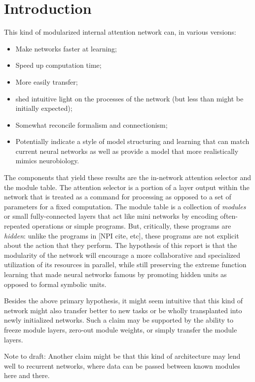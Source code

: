 \documentclass[12pt]{article}
\begin{document}
\section{Introduction}
This kind of modularized internal attention network can, in various versions:
\begin{itemize}
	\item Make networks faster at learning;
	\item Speed up computation time;
	\item More easily transfer;
	\item shed intuitive light on the processes of the network (but less than might be initially expected);
	\item Somewhat reconcile formalism and connectionism;
	\item Potentially indicate a style of model structuring and learning that can match current neural networks as well as provide a model that more realistically mimics neurobiology.
\end{itemize}
The components that yield these results are the in-network attention selector and the module table.  The attention selector is a portion of a layer output within the network that is treated as a command for processing as opposed to a set of parameters for a fixed computation.  The module table is a collection of \textit{modules} or small fully-connected layers that act like mini networks by encoding often-repeated operations or simple programs.  But, critically, these programs are \textit{hidden}: unlike the programs in [NPI cite, etc], these programs are not explicit about the action that they perform.  The hypothesis of this report is that the modularity of the network will encourage a more collaborative and specialized utilization of its resources in parallel, while still preserving the extreme function learning that made neural networks famous by promoting hidden units as opposed to formal symbolic units.
\par
Besides the above primary hypothesis, it might seem intuitive that this kind of network might also transfer better to new tasks or be wholly transplanted into newly initialized networks.  Such a claim may be supported by the ability to freeze module layers, zero-out module weights, or simply transfer the module layers.
\par
Note to draft: Another claim might be that this kind of architecture may lend well to recurrent networks, where data can be passed between known modules here and there.
\end{document}
